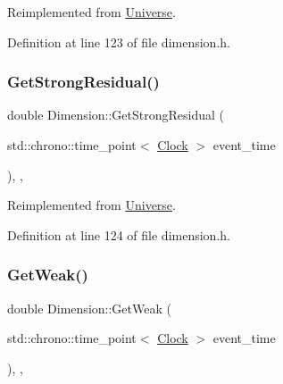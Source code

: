 Reimplemented from \hyperlink{class_universe_ab44daccba01ee7e3cf9b50bba83dd19e}{Universe}.



Definition at line 123 of file dimension.\+h.

\mbox{\label{class_dimension_aeee6025f17d9cd1bf7f324d715a30691}} 
\subsubsection{\texorpdfstring{Get\+Strong\+Residual()}{GetStrongResidual()}}
{\footnotesize\ttfamily double Dimension\+::\+Get\+Strong\+Residual (\begin{DoxyParamCaption}\item[{std\+::chrono\+::time\+\_\+point$<$ \hyperlink{universe_8h_a0ef8d951d1ca5ab3cfaf7ab4c7a6fd80}{Clock} $>$}]{event\+\_\+time }\end{DoxyParamCaption})\hspace{0.3cm}{\ttfamily [inline]}, {\ttfamily [final]}, {\ttfamily [virtual]}}



Reimplemented from \hyperlink{class_universe_af0f4b81950061e63c2855eb40957a5b1}{Universe}.



Definition at line 124 of file dimension.\+h.

\mbox{\label{class_dimension_a656ce92d07ea600cc0ec53865ad515e2}} 
\subsubsection{\texorpdfstring{Get\+Weak()}{GetWeak()}}
{\footnotesize\ttfamily double Dimension\+::\+Get\+Weak (\begin{DoxyParamCaption}\item[{std\+::chrono\+::time\+\_\+point$<$ \hyperlink{universe_8h_a0ef8d951d1ca5ab3cfaf7ab4c7a6fd80}{Clock} $>$}]{event\+\_\+time }\end{DoxyParamCaption})\hspace{0.3cm}{\ttfamily [inline]}, {\ttfamily [final]}, {\ttfamily [virtual]}}



